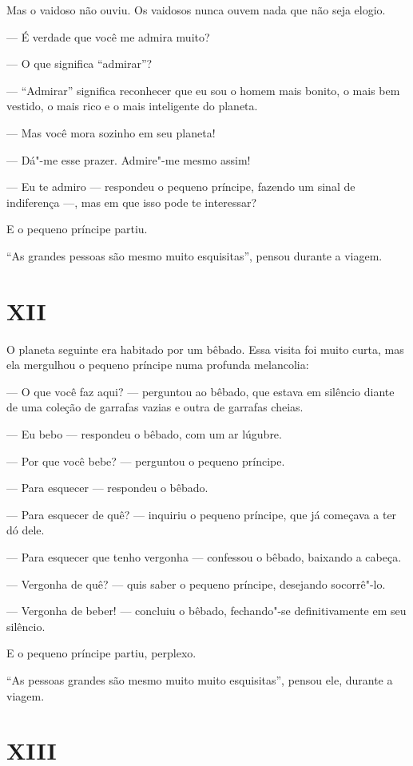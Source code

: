 \begin{Parallel}[p]{}{}
{Mas o vaidoso não ouviu. Os vaidosos nunca ouvem nada que não seja
elogio.

--- É verdade que você me admira muito?

--- O que significa ``admirar''?

--- ``Admirar'' significa reconhecer que eu sou o homem mais bonito, o
mais bem vestido, o mais rico e o mais inteligente do planeta.

--- Mas você mora sozinho em seu planeta!

--- Dá"-me esse prazer. Admire"-me mesmo assim!

--- Eu te admiro --- respondeu o pequeno príncipe, fazendo um sinal de
indiferença ---, mas em que isso pode te interessar?

E o pequeno príncipe partiu.

``As grandes pessoas são mesmo muito esquisitas'', pensou durante a
viagem.

\section{XII}

O planeta seguinte era habitado por um bêbado. Essa visita foi muito
curta, mas ela mergulhou o pequeno príncipe numa profunda melancolia:

--- O que você faz aqui? --- perguntou ao bêbado, que estava em silêncio
diante de uma coleção de garrafas vazias e outra de garrafas cheias.

--- Eu bebo --- respondeu o bêbado, com um ar lúgubre.

--- Por que você bebe? --- perguntou o pequeno príncipe.

--- Para esquecer --- respondeu o bêbado.

--- Para esquecer de quê? --- inquiriu o pequeno príncipe, que já começava
a ter dó dele.

--- Para esquecer que tenho vergonha --- confessou o bêbado, baixando a
cabeça.

--- Vergonha de quê? --- quis saber o pequeno príncipe, desejando
socorrê"-lo.

--- Vergonha de beber! --- concluiu o bêbado, fechando"-se definitivamente
em seu silêncio.

E o pequeno príncipe partiu, perplexo.

``As pessoas grandes são mesmo muito muito esquisitas'', pensou ele,
durante a viagem.

\section{XIII}

}
\end{Parallel}
